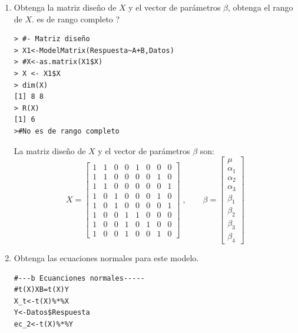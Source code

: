 \documentclass[10pt,a4paper]{report}
\begin{document}
\begin{enumerate}
    \item[a)] Obtenga la matriz diseño de $X$ y el vector de parámetros $\beta$, obtenga el rango de $X$. es de rango completo ?\\
\begin{verbatim}
> #- Matriz diseño
> X1<-ModelMatrix(Respuesta~A+B,Datos)
> #X<-as.matrix(X1$X)
> X <- X1$X
> dim(X)
[1] 8 8
> R(X)
[1] 6
>#No es de rango completo
\end{verbatim}
La matriz diseño de $X$ y el vector de parámetros $\beta$ son: \\
\[X=\begin{bmatrix}
1 & 1 & 0 & 0 & 1 & 0 & 0 & 0 \\
1 & 1 & 0 & 0 & 0 & 0 & 1 & 0 \\
1 & 1 & 0 & 0 & 0 & 0 & 0 & 1 \\
1 & 0 & 1 & 0 & 0 & 0 & 1 & 0 \\
1 & 0 & 1 & 0 & 0 & 0 & 0 & 1 \\
1 & 0 & 0 & 1 & 1 & 0 & 0 & 0 \\
1 & 0 & 0 & 1 & 0 & 1 & 0 & 0 \\
1 & 0 & 0 & 1 & 0 & 0 & 1 & 0
\end{bmatrix}\; , \qquad \beta = \begin{bmatrix}
\mu \\ \alpha_1 \\ \alpha_2 \\ \alpha_3 \\ 
\beta_1 \\ \beta_2 \\ \beta_3 \\ \beta_4 
\end{bmatrix}\]


\item[b)] Obtenga las ecuaciones normales para este modelo.
\begin{verbatim}
#---b Ecuanciones normales-----
#t(X)XB=t(X)Y
X_t<-t(X)%*%X
Y<-Datos$Respuesta
ec_2<-t(X)%*%Y
\end{verbatim}


\end{enumerate}
\end{document}
